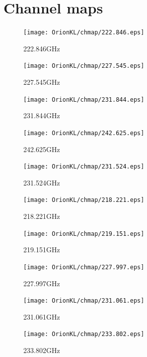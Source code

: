 \newpage

\section{Channel maps}

\begin{figure}[htbp]
  \centering
  \texttt{[image: OrionKL/chmap/222.846.eps]}
  \caption{222.846GHz}
  \label{ap_ch_1}
\end{figure}

\begin{figure}[htbp]
  \centering
  \texttt{[image: OrionKL/chmap/227.545.eps]}
  \caption{227.545GHz}
  \label{ap_ch_2}
\end{figure}

\begin{figure}[htbp]
  \centering
  \texttt{[image: OrionKL/chmap/231.844.eps]}
  \caption{231.844GHz}
  \label{ap_ch_3}
\end{figure}

\begin{figure}[htbp]
  \centering
  \texttt{[image: OrionKL/chmap/242.625.eps]}
  \caption{242.625GHz}
  \label{ap_ch_4}
\end{figure}

\begin{figure}[htbp]
  \centering
  \texttt{[image: OrionKL/chmap/231.524.eps]}
  \caption{231.524GHz}
  \label{ap_ch_5}
\end{figure}

\begin{figure}[htbp]
  \centering
  \texttt{[image: OrionKL/chmap/218.221.eps]}
  \caption{218.221GHz}
  \label{ap_ch_6}
\end{figure}

\begin{figure}[htbp]
  \centering
  \texttt{[image: OrionKL/chmap/219.151.eps]}
  \caption{219.151GHz}
  \label{ap_ch_7}
\end{figure}

\begin{figure}[htbp]
  \centering
  \texttt{[image: OrionKL/chmap/227.997.eps]}
  \caption{227.997GHz}
  \label{ap_ch_8}
\end{figure}

\begin{figure}[htbp]
  \centering
  \texttt{[image: OrionKL/chmap/231.061.eps]}
  \caption{231.061GHz}
  \label{ap_ch_9}
\end{figure}

\begin{figure}[htbp]
  \centering
  \texttt{[image: OrionKL/chmap/233.802.eps]}
  \caption{233.802GHz}
  \label{ap_ch_11}
\end{figure}

